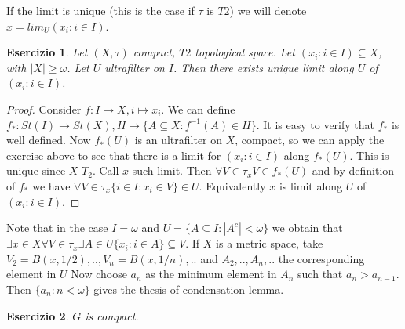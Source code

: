 \documentclass{article}
\newtheorem{exercise}{Esercizio}
\begin{document}
If the limit is unique (this is the case if $\tau$ is $T2$) we will denote $x = lim_{U} (x_i : i \in I)$.

\begin{exercise}

	Let $(X,\tau)$ compact, $T2$ topological space. Let $(x_i : i \in I) \subseteq X$, with $|X| \geq \omega$. Let $U$ ultrafilter on $I$.
	Then there exists unique limit along $U$ of $(x_i : i \in I)$.

\end{exercise}

\begin{proof}

	Consider $f: I \to X, i \mapsto x_i$. We can define $f_*: St(I) \to St(X), H \mapsto \{ A \subseteq X : f^{-1}(A) \in H \}$.
	It is easy to verify that $f_*$ is well defined. Now $f_*(U)$ is an ultrafilter on $X$, compact, so we can apply the exercise above to see that
	there is a limit for $(x_i : i \in I)$ along $f_*(U)$. This is unique since $X$ $T_2$. Call $x$ such limit.
	Then $ \forall V \in \tau_x V \in f_*(U) $ and by definition of $f_*$ we have $\forall V \in \tau_x \{i \in I : x_i \in V\} \in U$.
	Equivalently $x$ is limit along $U$ of $(x_i : i \in I)$.

\end{proof}

Note that in the case $I = \omega$ and $U = \{ A \subseteq I : |A^c| < \omega \}$ we obtain that $\exists x \in X \forall V \in \tau_x \exists A \in U \{x_i : i \in A\} \subseteq V$.
If $X$ is a metric space, take $V_2 = B(x,1/2),..,V_n = B(x,1/n),..$ and $A_2,..,A_n,..$ the corresponding element in $U$
Now choose $a_n$ as the minimum element in $A_n$ such that $a_n > a_{n-1}$. Then $\{ a_n : n < \omega \}$ gives the thesis of condensation lemma.

\begin{exercise}

	$G$ is compact.

\end{exercise}
\end{document}
